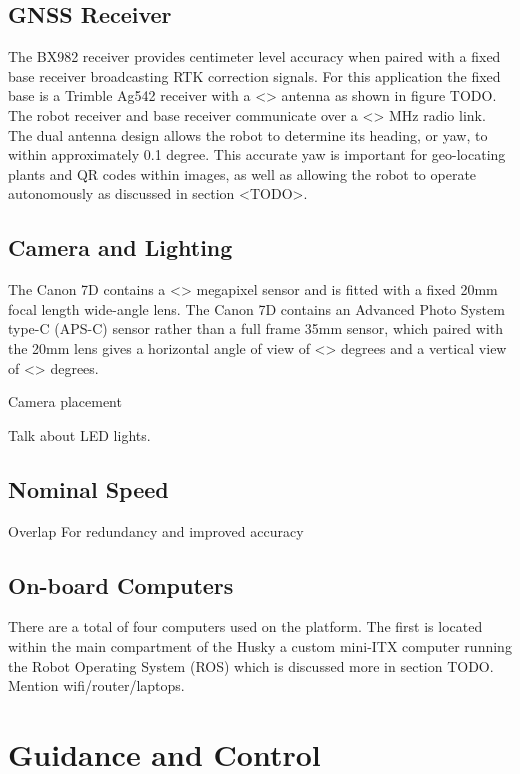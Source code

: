 \subsection{GNSS Receiver}

The BX982 receiver provides centimeter level accuracy when paired with a fixed base receiver broadcasting RTK correction signals.  For this application the fixed base is a Trimble Ag542 receiver with a <> antenna as shown in figure TODO.  The robot receiver and base receiver communicate over a <> MHz radio link.   The dual antenna design allows the robot to determine its heading, or yaw, to within approximately 0.1 degree.  This accurate yaw is important for geo-locating plants and QR codes within images, as well as allowing the robot to operate autonomously as discussed in section <TODO>. 

\subsection{Camera and Lighting}

The Canon 7D contains a <> megapixel sensor and is fitted with a fixed 20mm focal length wide-angle lens.  The Canon 7D contains an Advanced Photo System type-C (APS-C) sensor rather than a full frame 35mm sensor, which paired with the 20mm lens gives a horizontal angle of view of <> degrees and a vertical view of <> degrees.  

Camera placement

Talk about LED lights.  

\subsection{Nominal Speed}

Overlap
For redundancy and improved accuracy

\subsection{On-board Computers}

There are a total of four computers used on the platform.  The first is located within the main compartment of the Husky a custom mini-ITX computer running the Robot Operating System (ROS) which is discussed more in section TODO.  
Mention wifi/router/laptops.  

\section{Guidance and Control}
\label{system-modes}

